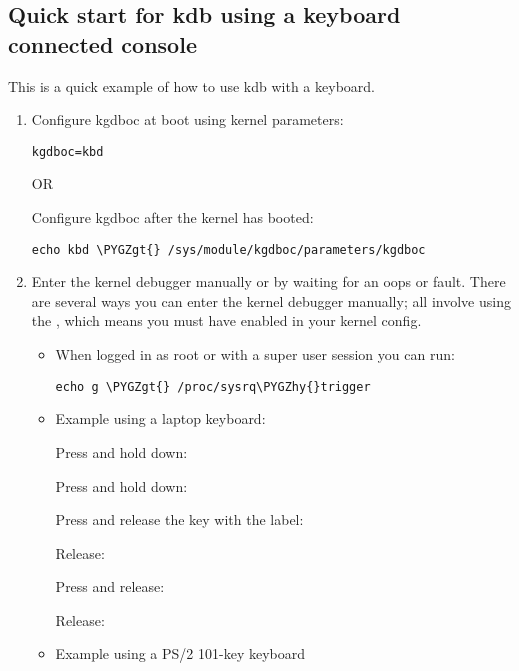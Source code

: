 \documentclass[a4paper,8pt,english]{sphinxmanual}
\def\PYGZgt{\char`\>}
\def\PYGZhy{\char`\-}
\begin{document}
\subsection{Quick start for kdb using a keyboard connected console}
\label{dev-tools/kgdb:quick-start-for-kdb-using-a-keyboard-connected-console}
This is a quick example of how to use kdb with a keyboard.
\begin{enumerate}
\item {} 
Configure kgdboc at boot using kernel parameters:

\begin{Verbatim}[commandchars=\\\{\}]
kgdboc=kbd
\end{Verbatim}

OR

Configure kgdboc after the kernel has booted:

\begin{Verbatim}[commandchars=\\\{\}]
echo kbd \PYGZgt{} /sys/module/kgdboc/parameters/kgdboc
\end{Verbatim}

\item {} 
Enter the kernel debugger manually or by waiting for an oops or
fault. There are several ways you can enter the kernel debugger
manually; all involve using the , which means you must have
enabled  in your kernel config.
\begin{itemize}
\item {} 
When logged in as root or with a super user session you can run:

\begin{Verbatim}[commandchars=\\\{\}]
echo g \PYGZgt{} /proc/sysrq\PYGZhy{}trigger
\end{Verbatim}

\item {} 
Example using a laptop keyboard:

Press and hold down: 

Press and hold down: 

Press and release the key with the label: 

Release: 

Press and release: 

Release: 

\item {} 
Example using a PS/2 101-key keyboard


\end{itemize}
\end{enumerate}
\end{document}
